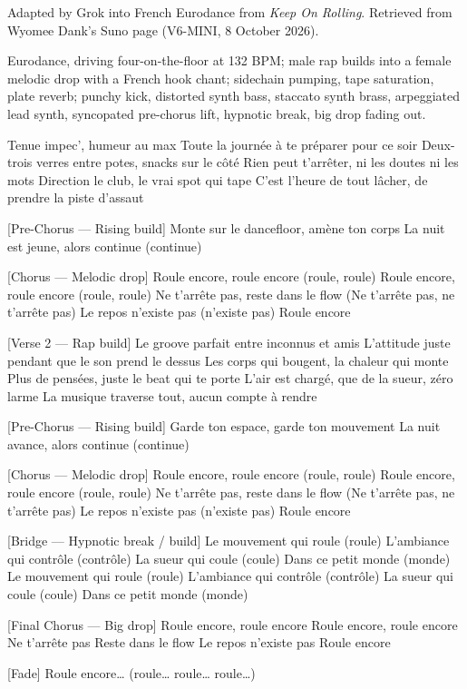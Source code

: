 \begin{notes}
Adapted by Grok into French Eurodance from \emph{Keep On Rolling}. Retrieved from Wyomee Dank's Suno page (V6-MINI, 8 October 2026).
\end{notes}
\begin{style}
Eurodance, driving four-on-the-floor at 132 BPM; male rap builds into a female melodic drop with a French hook chant; sidechain pumping, tape saturation, plate reverb; punchy kick, distorted synth bass, staccato synth brass, arpeggiated lead synth, syncopated pre-chorus lift, hypnotic break, big drop fading out.
\end{style}
\begin{lyrics}
Tenue impec’, humeur au max
Toute la journée à te préparer pour ce soir
Deux-trois verres entre potes, snacks sur le côté
Rien peut t’arrêter, ni les doutes ni les mots
Direction le club, le vrai spot qui tape
C’est l’heure de tout lâcher, de prendre la piste d’assaut

[Pre-Chorus — Rising build]
Monte sur le dancefloor, amène ton corps
La nuit est jeune, alors continue (continue)

[Chorus — Melodic drop]
Roule encore, roule encore (roule, roule)
Roule encore, roule encore (roule, roule)
Ne t’arrête pas, reste dans le flow
(Ne t’arrête pas, ne t’arrête pas)
Le repos n’existe pas (n’existe pas)
Roule encore

[Verse 2 — Rap build]
Le groove parfait entre inconnus et amis
L’attitude juste pendant que le son prend le dessus
Les corps qui bougent, la chaleur qui monte
Plus de pensées, juste le beat qui te porte
L’air est chargé, que de la sueur, zéro larme
La musique traverse tout, aucun compte à rendre

[Pre-Chorus — Rising build]
Garde ton espace, garde ton mouvement
La nuit avance, alors continue (continue)

[Chorus — Melodic drop]
Roule encore, roule encore (roule, roule)
Roule encore, roule encore (roule, roule)
Ne t’arrête pas, reste dans le flow
(Ne t’arrête pas, ne t’arrête pas)
Le repos n’existe pas (n’existe pas)
Roule encore

[Bridge — Hypnotic break / build]
Le mouvement qui roule (roule)
L’ambiance qui contrôle (contrôle)
La sueur qui coule (coule)
Dans ce petit monde (monde)
Le mouvement qui roule (roule)
L’ambiance qui contrôle (contrôle)
La sueur qui coule (coule)
Dans ce petit monde (monde)

[Final Chorus — Big drop]
Roule encore, roule encore
Roule encore, roule encore
Ne t’arrête pas
Reste dans le flow
Le repos n’existe pas
Roule encore

[Fade]
Roule encore…
(roule… roule… roule…)
\end{lyrics}


